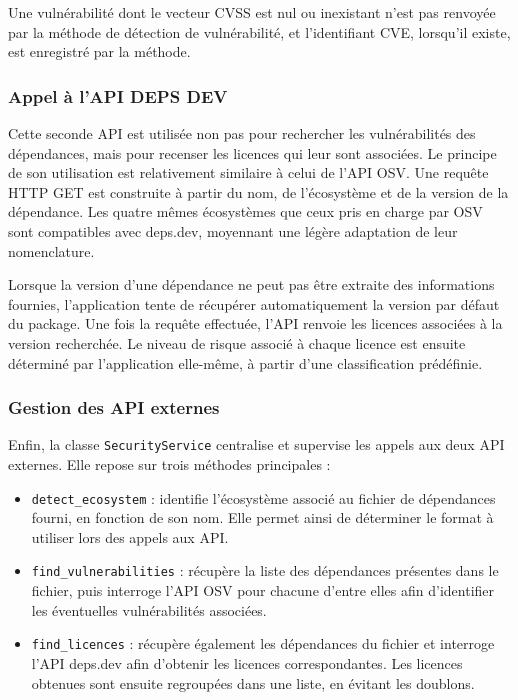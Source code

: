 \documentclass[a4paper,12pt]{article}
\providecommand{\tightlist}{\setlength{\itemsep}{0pt}\setlength{\parskip}{0pt}}
\providecommand{\tightlist}{}
\begin{document}
Une vulnérabilité dont le vecteur CVSS est nul ou inexistant n'est pas
renvoyée par la méthode de détection de vulnérabilité, et l'identifiant
CVE, lorsqu'il existe, est enregistré par la méthode.

\subsubsection{Appel à l'API DEPS DEV}\label{appel-uxe0-lapi-deps-dev}

Cette seconde API est utilisée non pas pour rechercher les
vulnérabilités des dépendances, mais pour recenser les licences qui leur
sont associées. Le principe de son utilisation est relativement
similaire à celui de l'API OSV. Une requête HTTP GET est construite à
partir du nom, de l'écosystème et de la version de la dépendance. Les
quatre mêmes écosystèmes que ceux pris en charge par OSV sont
compatibles avec deps.dev, moyennant une légère adaptation de leur
nomenclature.

Lorsque la version d'une dépendance ne peut pas être extraite des
informations fournies, l'application tente de récupérer automatiquement
la version par défaut du package. Une fois la requête effectuée, l'API
renvoie les licences associées à la version recherchée. Le niveau de
risque associé à chaque licence est ensuite déterminé par l'application
elle-même, à partir d'une classification prédéfinie.

\subsubsection{Gestion des API externes}\label{gestion-des-api-externes}

Enfin, la classe \texttt{SecurityService} centralise et supervise les
appels aux deux API externes. Elle repose sur trois méthodes principales
:

\begin{itemize}
\tightlist
\item
  \texttt{detect\_\allowbreak{}ecosystem} : identifie l'écosystème
  associé au fichier de dépendances fourni, en fonction de son nom. Elle
  permet ainsi de déterminer le format à utiliser lors des appels aux
  API.
\item
  \texttt{find\_\allowbreak{}vulnerabilities} : récupère la liste des
  dépendances présentes dans le fichier, puis interroge l'API OSV pour
  chacune d'entre elles afin d'identifier les éventuelles vulnérabilités
  associées.
\item
  \texttt{find\_\allowbreak{}licences} : récupère également les
  dépendances du fichier et interroge l'API deps.dev afin d'obtenir les
  licences correspondantes. Les licences obtenues sont ensuite
  regroupées dans une liste, en évitant les doublons.
\end{itemize}
\end{document}
